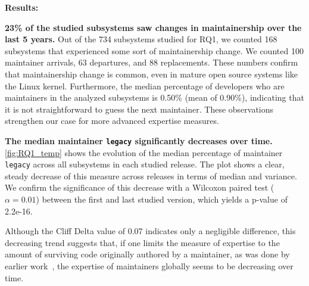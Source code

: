 {\bf Results:}

\textbf{23\% of the studied subsystems saw changes in maintainership over the last 5 years.} Out of the 734 subsystems studied for RQ1, we counted 168 subsystems that experienced some sort of maintainership change. We counted 100 maintainer arrivals, 63 departures, and 88 replacements. These numbers confirm that maintainership change is common, even in mature open source systems like the Linux kernel. Furthermore, the median percentage of developers who are maintainers in the analyzed subsystems is 0.50\% (mean of 0.90\%), indicating that it is not straightforward to guess the next maintainer. These observations strengthen our case for more advanced expertise measures.

\textbf{The median maintainer \texttt{legacy} significantly decreases over time.} \autoref{fig:RQ1_temp} shows the evolution of the median percentage of maintainer \texttt{legacy} across all subsystems in each studied release. The plot shows a clear, steady decrease of this measure across releases in terms of median and variance. We confirm the significance of this decrease with a Wilcoxon paired test ($\alpha=0.01$) between the first and last studied version, which yields a p-value of 2.2e-16.%


Although the Cliff Delta value of 0.07 indicates only a negligible difference, this decreasing trend suggests that, if one limits the measure of expertise to the amount of surviving code originally authored by a maintainer, as was done by earlier work~\cite{Rahman-2011}, the expertise of maintainers globally seems to be decreasing over time. 





